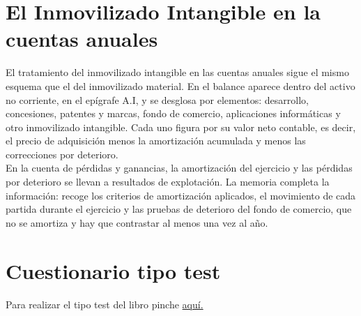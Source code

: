 \documentclass[a4paper,12pt]{article}
\begin{document}
\section{El Inmovilizado Intangible en la cuentas anuales}
El tratamiento del inmovilizado intangible en las cuentas anuales sigue el mismo
esquema que el del inmovilizado material. En el balance aparece dentro del activo
no corriente, en el epígrafe A.I, y se desglosa por elementos: desarrollo,
concesiones, patentes y marcas, fondo de comercio, aplicaciones informáticas y
otro inmovilizado intangible. Cada uno figura por su valor neto contable, es
decir, el precio de adquisición menos la amortización acumulada y menos las
correcciones por deterioro.\\

En la cuenta de pérdidas y ganancias, la amortización del ejercicio y las
pérdidas por deterioro se llevan a resultados de explotación. La memoria completa
la información: recoge los criterios de amortización aplicados, el movimiento de
cada partida durante el ejercicio y las pruebas de deterioro del fondo de
comercio, que no se amortiza y hay que contrastar al menos una vez al año.


\section{Cuestionario tipo test}
Para realizar el tipo test del libro pinche \href{https://elblogdeismael.github.io/Subjects/Third/CF1/Tests/testT6Libro.html}{aquí.}
\end{document}
